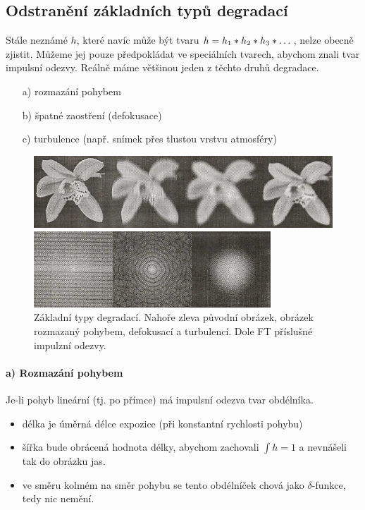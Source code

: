 \subsection{Odstranění základních typů degradací}

Stále neznámé $h$, které navíc může být tvaru $h=h_1\ast h_2\ast h_3 \ast \dots$, nelze obecně zjistit. Můžeme jej
pouze předpokládat ve speciálních tvarech, abychom znali tvar impulsní odezvy. Reálně máme většinou jeden z těchto druhů degradace.

\begin{itemize}
\item[a)] rozmazání pohybem
\item[b)] špatné zaostření (defokusace)
\item[c)] turbulence (např. snímek přes tlustou vrstvu atmosféry)
\end{itemize}

\begin{figure}
\centering
\includegraphics[width=12cm]{picture/png/screenshot001}

\hspace*{3.1cm}\includegraphics[width=8.9cm]{picture/png/screenshot002}
\caption{Základní typy degradací. Nahoře zleva původní obrázek, obrázek rozmazaný pohybem, defokusací a turbulencí. Dole FT příslušné impulzní odezvy.}
\label{fig:screenshot001}
\end{figure}


\paragraph{a) Rozmazání pohybem} Je-li pohyb lineární (tj. po přímce) má impulsní odezva tvar obdélníka. 
\begin{itemize}
\item délka je úměrná délce expozice (při konstantní rychlosti pohybu)
\item šířka bude obrácená hodnota délky, abychom zachovali $\int h=1$ a nevnášeli tak do obrázku
jas. 
\item ve směru kolmém na směr pohybu se tento obdélníček chová jako $\delta$-funkce, tedy nic nemění. 
\end{itemize}

